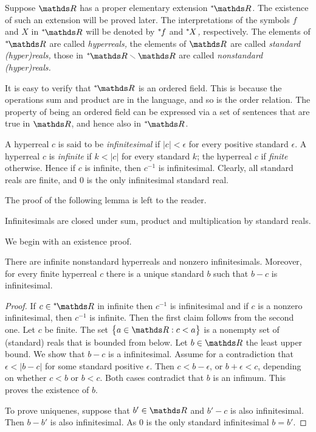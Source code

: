 Suppose $\RR$ has a proper elementary extension \emph{$\nsR$.} The existence of such an extension will be proved later.
 The interpretations of the symbols $f$ and $X$ in \emph{$\nsR$} will be denoted by  \emph{${}^*\kern-.2ex f$} and \emph{${}^*\kern-.2ex X$,} respectively.
The elements of $\nsR$ are called \emph{hyperreals,} the elements of  $\RR$ are called \emph{standard (hyper)reals,} those in $\nsR\sm\RR$ are called  \emph{nonstandard (hyper)reals.}

It is easy to verify that $\nsR$ is an ordered field.
This is because the operations sum and product are in the language, and so is the order relation.
The property of being an ordered field can be expressed via a set of sentences  that are true in $\RR$, and hence also in $\nsR$.

A hyperreal $c$ is said to be \emph{infinitesimal} if $|c|<\epsilon$ for every positive standard $\epsilon$.
A hyperreal $c$ is \emph{infinite} if $k<|c|$ for every standard $k$; the hyperreal $c$ if \emph{finite} otherwise.
Hence if $c$ is infinite, then $c^{-1}$ is infinitesimal.
Clearly, all standard reals are finite, and $0$ is the only infinitesimal standard real.

The proof of the following lemma is left to the reader.

\begin{fact}\label{prodottosommainfinitesimi}
Infinitesimals are closed under sum, product and multiplication by standard reals.
\end{fact}

We begin with an existence proof.

\begin{lemma}\label{lem_esistenzainfinitesimi}
  There are infinite nonstandard hyperreals and nonzero infinitesimals.
  Moreover, for every finite hyperreal $c$ there is a unique standard $b$ such that $b-c$ is infinitesimal.
\end{lemma}
\begin{proof}
If $c\in\nsR$ in infinite then $c^{-1}$ is infinitesimal and if $c$ is a nonzero infinitesimal, then $c^{-1}$ is infinite.
Then the first claim follows from the second one.
Let $c$ be finite.
The set $\big\{ a\in\RR: c<a\big\}$ is a nonempty set of (standard) reals that is bounded from below.
Let $b\in\RR$ the least upper bound.
We show that $b-c$ is a infinitesimal.
Assume for a contradiction that $\epsilon < |b-c|$ for some standard positive $\epsilon$.
Then $c<b-\epsilon$, or $b+\epsilon< c$, depending on whether $c<b$ or $b<c$.
Both cases contradict that $b$ is an infimum.
This proves the existence of $b$.

To prove uniquenes, suppose that $b'\in\RR$ and $b'-c$ is also infinitesimal.
Then $b-b'$ is also infinitesimal.
As $0$ is the only standard infinitesimal $b=b'$.
\end{proof}

